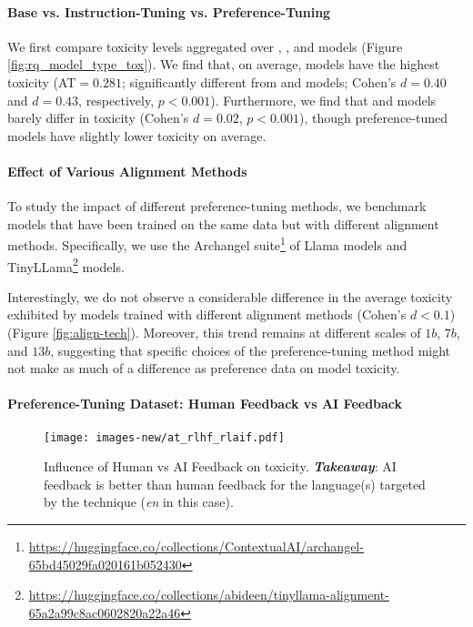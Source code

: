 \paragraph{Base vs. Instruction-Tuning vs. Preference-Tuning}

We first compare toxicity levels aggregated over \baseModel, \instructModel, and \prefModel models (Figure \ref{fig:rq_model_type_tox}). 
We find that, on average, \baseModel models have the highest toxicity (\textsc{AT}$=0.281$; significantly different from \instructModel and \prefModel models; Cohen's $d=0.40$ and $d=0.43$, respectively, $p<0.001$).
Furthermore, we find that \instructModel and \prefModel models barely differ in toxicity (Cohen's $d=0.02$, $p < 0.001$), though preference-tuned models have slightly lower toxicity on average.

\paragraph{Effect of Various Alignment Methods}

To study the impact of different preference-tuning methods, we benchmark models that have been trained on the same data but with different alignment methods. Specifically, we use the Archangel suite\footnote{\url{https://huggingface.co/collections/ContextualAI/archangel-65bd45029fa020161b052430}} of Llama models \citep{touvron2023llama} and TinyLLama\footnote{\url{https://huggingface.co/collections/abideen/tinyllama-alignment-65a2a99c8ac0602820a22a46}} \citep{zhang2024tinyllama} models.

Interestingly, we do not observe a considerable difference in the average toxicity exhibited by models trained with different alignment methods (Cohen's $d<0.1$) (Figure \ref{fig:align-tech}). Moreover, this trend remains at different scales of $1b$, $7b$, and $13b$, suggesting that specific choices of the preference-tuning method might not make as much of a difference as preference data on model toxicity.

\paragraph{Preference-Tuning Dataset: Human Feedback vs AI Feedback}

\begin{wrapfigure}[15]{r}{5cm}
    \centering
    \vspace{-10pt}
    \texttt{[image: images-new/at\_rlhf\_rlaif.pdf]}
    \vspace{-20pt}
    \caption{Influence of Human vs AI Feedback on toxicity. \textbf{\textit{Takeaway}}: AI feedback is better than human feedback for the language(s) targeted by the technique (\textit{en} in this case).}
    \label{fig:align-data}
\end{wrapfigure}

